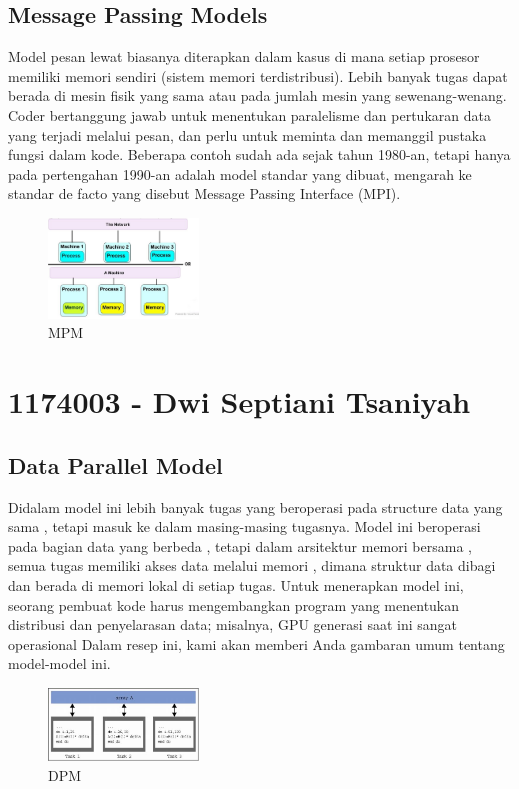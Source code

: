 \subsection{Message Passing Models}
\hfill\break
Model pesan lewat biasanya diterapkan dalam kasus di mana setiap prosesor memiliki memori sendiri (sistem memori terdistribusi). Lebih banyak tugas dapat berada di mesin fisik yang sama atau pada jumlah mesin yang sewenang-wenang. Coder bertanggung jawab untuk menentukan paralelisme dan pertukaran data yang terjadi melalui pesan, dan perlu untuk meminta dan memanggil pustaka fungsi dalam kode. Beberapa contoh sudah ada sejak tahun 1980-an, tetapi hanya pada pertengahan 1990-an adalah model standar yang dibuat, mengarah ke standar de facto yang disebut Message Passing Interface (MPI).
 \begin{figure}[H]
        \includegraphics[width=4cm]{figures/kelompok3/1/dwi4.PNG}
        \centering
        \caption{MPM}
\end{figure}

\section{1174003 - Dwi Septiani Tsaniyah}
\subsection{Data Parallel Model}
\hfill\break
Didalam model ini lebih banyak tugas yang beroperasi pada structure data yang sama , tetapi masuk ke dalam masing-masing tugasnya. Model ini beroperasi pada bagian data yang berbeda , tetapi dalam arsitektur memori bersama , semua tugas memiliki akses data melalui memori , dimana struktur data dibagi dan berada di memori lokal di setiap tugas. Untuk menerapkan model ini, seorang pembuat kode harus mengembangkan program yang menentukan distribusi dan penyelarasan data; misalnya, GPU generasi saat ini sangat operasional 
Dalam resep ini, kami akan memberi Anda gambaran umum tentang model-model ini.
 \begin{figure}[H]
        \includegraphics[width=4cm]{figures/kelompok3/1/septi.jpg}
        \centering
        \caption{DPM}
\end{figure}
